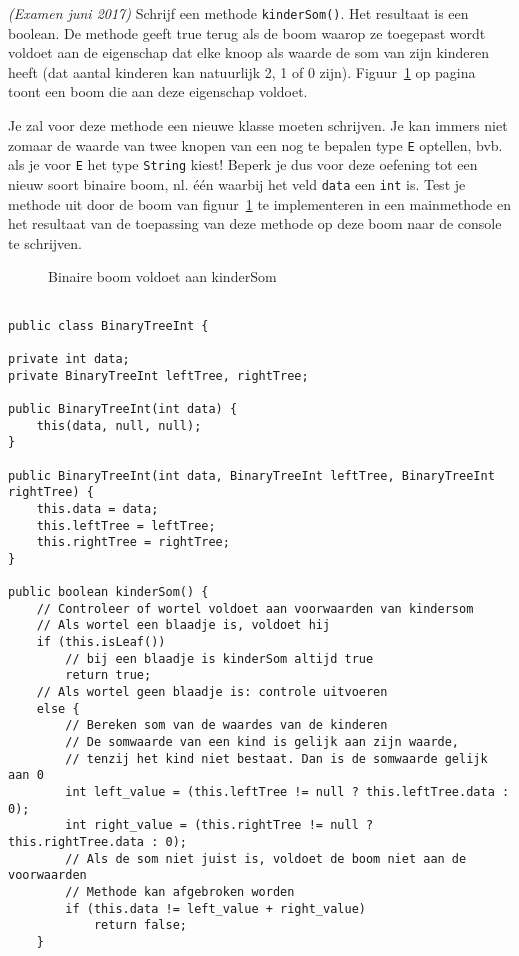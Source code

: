 \begin{oef}
\code \emph{(Examen juni 2017)} Schrijf een methode \verb+kinderSom()+. Het resultaat is een boolean. De methode geeft true terug als de boom waarop ze toegepast wordt voldoet aan de eigenschap dat elke knoop als waarde de som van zijn kinderen heeft (dat aantal kinderen kan natuurlijk 2, 1 of 0 zijn). Figuur~\ref{fig:herhalingsoefbbkindersom} op pagina~\pageref{fig:herhalingsoefbbkindersom} toont een boom die aan deze eigenschap voldoet.

Je zal voor deze methode een nieuwe klasse moeten schrijven. Je kan immers niet zomaar de waarde van twee knopen van een nog te bepalen type \verb+E+ optellen, bvb. als je voor \verb+E+ het type \verb+String+ kiest! Beperk je dus voor deze oefening tot een nieuw soort binaire boom, nl. één waarbij het veld \verb+data+ een \verb+int+ is. Test je methode uit door de boom van figuur~\ref{fig:herhalingsoefbbkindersom} te implementeren in een mainmethode en het resultaat van de toepassing van deze methode op deze boom naar de console te schrijven.
\begin{figure}[htbp]
    \centering
{}
\caption{Binaire boom voldoet aan kinderSom}
    \label{fig:herhalingsoefbbkindersom}
\end{figure}
\begin{opl}
	\begin{lstlisting}[caption={kinderSom() methode}, label=kinderSom]
	
public class BinaryTreeInt {

private int data;
private BinaryTreeInt leftTree, rightTree;

public BinaryTreeInt(int data) {
	this(data, null, null);
}

public BinaryTreeInt(int data, BinaryTreeInt leftTree, BinaryTreeInt rightTree) {
	this.data = data;
	this.leftTree = leftTree;
	this.rightTree = rightTree;
}
	
public boolean kinderSom() {
	// Controleer of wortel voldoet aan voorwaarden van kindersom
	// Als wortel een blaadje is, voldoet hij 
	if (this.isLeaf())
		// bij een blaadje is kinderSom altijd true
		return true;
	// Als wortel geen blaadje is: controle uitvoeren
	else {
		// Bereken som van de waardes van de kinderen
		// De somwaarde van een kind is gelijk aan zijn waarde, 
		// tenzij het kind niet bestaat. Dan is de somwaarde gelijk aan 0
		int left_value = (this.leftTree != null ? this.leftTree.data : 0);
		int right_value = (this.rightTree != null ? this.rightTree.data : 0);
		// Als de som niet juist is, voldoet de boom niet aan de voorwaarden
		// Methode kan afgebroken worden
		if (this.data != left_value + right_value)
			return false;
	}
	

\end{lstlisting}
\end{opl}
\end{oef}
